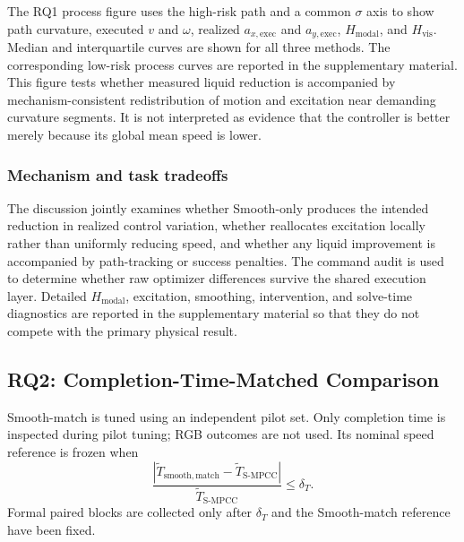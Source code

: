 The RQ1 process figure uses the high-risk path and a common $\sigma$ axis to
show path curvature, executed $v$ and $\omega$, realized
$a_{x,\mathrm{exec}}$ and $a_{y,\mathrm{exec}}$,
$H_{\mathrm{modal}}$, and $H_{\mathrm{vis}}$. Median and interquartile curves
are shown for all three methods. The corresponding low-risk process curves are
reported in the supplementary material. This figure tests whether measured
liquid reduction is accompanied by mechanism-consistent redistribution of
motion and excitation near demanding curvature segments. It is not interpreted
as evidence that the controller is better merely because its global mean speed
is lower.

\subsubsection{Mechanism and task tradeoffs}

The discussion jointly examines whether Smooth-only produces the intended
reduction in realized control variation, whether \SMPCC{} reallocates
excitation locally rather than uniformly reducing speed, and whether any liquid
improvement is accompanied by path-tracking or success penalties. The command
audit is used to determine whether raw optimizer differences survive the shared
execution layer. Detailed $H_{\mathrm{modal}}$, excitation, smoothing,
intervention, and solve-time diagnostics are reported in the supplementary
material so that they do not compete with the primary physical result.


\subsection{RQ2: Completion-Time-Matched Comparison}

Smooth-match is tuned using an independent pilot set. Only completion time is
inspected during pilot tuning; RGB outcomes are not used. Its nominal speed
reference is frozen when
\begin{equation}
  \frac{
  |\widetilde T_{\mathrm{smooth,match}}
  -\widetilde T_{\mathrm{S\text{-}MPCC}}|}
  {\widetilde T_{\mathrm{S\text{-}MPCC}}}
  \leq\delta_T.
  \label{eq:time_matching}
\end{equation}
Formal paired blocks are collected only after $\delta_T$ and the Smooth-match
reference have been fixed.


